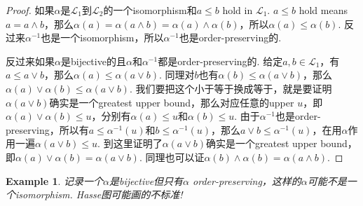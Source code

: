 \documentclass{article}
\newtheorem{example}[theorem]{Example}
\newcommand\lattice{\mathcal{L}}
\begin{document}
\begin{proof}
如果$\alpha$是$\lattice_1$到$\lattice_2$的一个isomorphism和$a \leq b$ hold in $\lattice_1$. $a \leq b$ hold means $a = a \wedge b$，那么$\alpha(a) = \alpha(a \wedge b) = \alpha(a) \wedge \alpha(b)$，所以$\alpha(a) \leq \alpha(b)$. 反过来$\alpha^{-1}$也是一个isomorphism，所以$\alpha^{-1}$也是order-preserving的.

反过来如果$\alpha$是bijective的且$\alpha$和$\alpha^{-1}$都是order-preserving的. 给定$a,b \in \lattice_1$，有$a \leq a \vee b$，那么$\alpha(a) \leq \alpha(a \vee b )$. 同理对$b$也有$\alpha(b) \leq \alpha(a \vee b)$，那么$\alpha(a) \vee \alpha(b) \leq \alpha(a \vee b)$. 我们要把这个小于等于换成等于，就是要证明$\alpha(a \vee b)$确实是一个greatest upper bound，那么对应任意的upper $u$，即$\alpha(a) \vee \alpha(b) \leq u$，分别有$\alpha(a) \leq u$和$\alpha(b) \leq u$. 由于$\alpha^{-1}$也是order-preserving，所以有$a \leq \alpha^{-1}(u)$和$b \leq \alpha^{-1}(u)$，那么$a \vee b \leq \alpha^{-1}(u)$，在用$\alpha$作用一遍$\alpha(a \vee b) \leq u$. 到这里证明了$\alpha(a \vee b)$确实是一个greatest upper bound，即$\alpha(a) \vee \alpha(b) = \alpha(a \vee b)$. 同理也可以证$\alpha(b) \wedge \alpha(b) = \alpha(a \wedge b)$.
\end{proof}

\begin{example}
\rm 记录一个$\alpha$是bijective但只有$\alpha$ order-preserving，这样的$\alpha$可能不是一个isomorphism. Hasse图可能画的不标准!
\begin{center}
\end{center}
\end{example}
\end{document}
